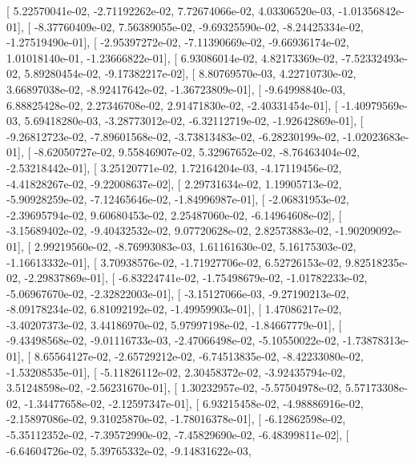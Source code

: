 \documentclass{article}
\begin{document}
       [  5.22570041e-02,  -2.71192262e-02,   7.72674066e-02,
          4.03306520e-03,  -1.01356842e-01],
       [ -8.37760409e-02,   7.56389055e-02,  -9.69325590e-02,
         -8.24425334e-02,  -1.27519490e-01],
       [ -2.95397272e-02,  -7.11390669e-02,  -9.66936174e-02,
          1.01018140e-01,  -1.23666822e-01],
       [  6.93086014e-02,   4.82173369e-02,  -7.52332493e-02,
          5.89280454e-02,  -9.17382217e-02],
       [  8.80769570e-03,   4.22710730e-02,   3.66897038e-02,
         -8.92417642e-02,  -1.36723809e-01],
       [ -9.64998840e-03,   6.88825428e-02,   2.27346708e-02,
          2.91471830e-02,  -2.40331454e-01],
       [ -1.40979569e-03,   5.69418280e-03,  -3.28773012e-02,
         -6.32112719e-02,  -1.92642869e-01],
       [ -9.26812723e-02,  -7.89601568e-02,  -3.73813483e-02,
         -6.28230199e-02,  -1.02023683e-01],
       [ -8.62050727e-02,   9.55846907e-02,   5.32967652e-02,
         -8.76463404e-02,  -2.53218442e-01],
       [  3.25120771e-02,   1.72164204e-03,  -4.17119456e-02,
         -4.41828267e-02,  -9.22008637e-02],
       [  2.29731634e-02,   1.19905713e-02,  -5.90928259e-02,
         -7.12465646e-02,  -1.84996987e-01],
       [ -2.06831953e-02,  -2.39695794e-02,   9.60680453e-02,
          2.25487060e-02,  -6.14964608e-02],
       [ -3.15689402e-02,  -9.40432532e-02,   9.07720628e-02,
          2.82573883e-02,  -1.90209092e-01],
       [  2.99219560e-02,  -8.76993083e-03,   1.61161630e-02,
          5.16175303e-02,  -1.16613332e-01],
       [  3.70938576e-02,  -1.71927706e-02,   6.52726153e-02,
          9.82518235e-02,  -2.29837869e-01],
       [ -6.83224741e-02,  -1.75498679e-02,  -1.01782233e-02,
         -5.06967670e-02,  -2.32822003e-01],
       [ -3.15127066e-03,  -9.27190213e-02,  -8.09178234e-02,
          6.81092192e-02,  -1.49959903e-01],
       [  1.47086217e-02,  -3.40207373e-02,   3.44186970e-02,
          5.97997198e-02,  -1.84667779e-01],
       [ -9.43498568e-02,  -9.01116733e-03,  -2.47066498e-02,
         -5.10550022e-02,  -1.73878313e-01],
       [  8.65564127e-02,  -2.65729212e-02,  -6.74513835e-02,
         -8.42233080e-02,  -1.53208535e-01],
       [ -5.11826112e-02,   2.30458372e-02,  -3.92435794e-02,
          3.51248598e-02,  -2.56231670e-01],
       [  1.30232957e-02,  -5.57504978e-02,   5.57173308e-02,
         -1.34477658e-02,  -2.12597347e-01],
       [  6.93215458e-02,  -4.98886916e-02,  -2.15897086e-02,
          9.31025870e-02,  -1.78016378e-01],
       [ -6.12862598e-02,  -5.35112352e-02,  -7.39572990e-02,
         -7.45829690e-02,  -6.48399811e-02],
       [ -6.64604726e-02,   5.39765332e-02,  -9.14831622e-03,
\end{document}
